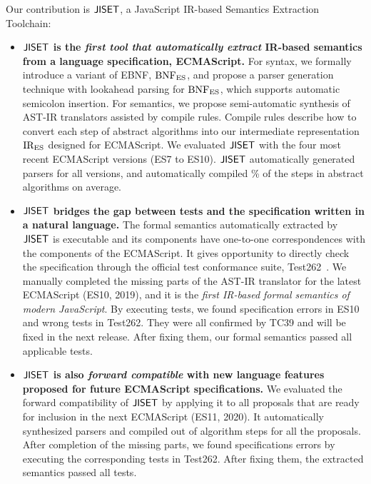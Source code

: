 Our contribution is \( \text{\sf JISET} \), a JavaScript IR-based Semantics Extraction
Toolchain:
\begin{itemize}[leftmargin=0.5cm]
  \item \textbf{\( \text{\sf JISET} \) is the \textit{first tool that automatically
    extract} IR-based semantics from a language specification, ECMAScript.}
    For syntax, we formally introduce a variant of EBNF, \( \text{BNF}_{\text{ES}} \),
    and propose a parser generation technique with
    lookahead parsing for \( \text{BNF}_{\text{ES}} \), which supports automatic semicolon
    insertion. For semantics, we propose semi-automatic synthesis of AST-IR
    translators assisted by compile rules.  Compile rules describe
    how to convert each step of abstract algorithms into our intermediate
    representation \( \text{IR}_\text{ES} \) designed for ECMAScript. We evaluated \( \text{\sf JISET} \)
    with the four most recent ECMAScript versions (ES7 to ES10).   \( \text{\sf JISET} \)
    automatically generated parsers for all versions, and automatically compiled
    \% of the steps in abstract algorithms on average.
  \item \textbf{\( \text{\sf JISET} \) bridges the gap between tests and the specification
    written in a natural language.}
    The formal semantics automatically extracted by \( \text{\sf JISET} \) is executable
    and its components have one-to-one correspondences with the components of
    the ECMAScript.  It gives opportunity to directly check the specification
    through the official test conformance suite, Test262~\cite{test262}.  We
    manually completed the missing parts of the AST-IR translator for the latest
    ECMAScript (ES10, 2019), and it is the \textit{first IR-based formal
    semantics of modern JavaScript}.  By executing tests, we found 
    specification errors in ES10 and  wrong tests in Test262. They
    were all confirmed by TC39 and will be fixed in the next release.  After
    fixing them, our formal semantics passed all  applicable
    tests.
  \item \textbf{\( \text{\sf JISET} \) is also \textit{forward compatible} with new
    language features proposed for future ECMAScript specifications.}
    We evaluated the forward compatibility of \( \text{\sf JISET} \) by applying it to all
     proposals that are ready for inclusion in the next ECMAScript
    (ES11, 2020).  It automatically synthesized parsers and compiled 
    out of  algorithm steps for all the proposals.  After completion
    of the missing parts, we found  specifications errors by executing
    the corresponding tests in Test262.  After fixing them, the extracted
    semantics passed all  tests.
\end{itemize}
